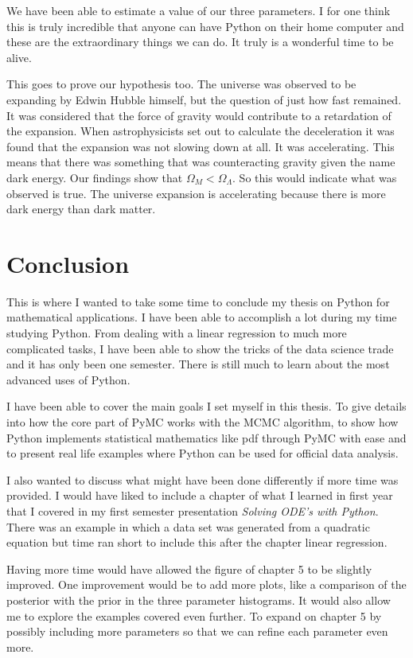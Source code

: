 \documentclass[12pt,twoside]{report}   %
\begin{document}
We have been able to estimate a value of our three parameters. I for one think this is truly incredible that anyone can have Python on their home computer and these are the extraordinary things we can do. It truly is a wonderful time to be alive.

This goes to prove our hypothesis too. The universe was observed to be expanding by Edwin Hubble himself, but the question of just how fast remained. It was considered that the force of gravity would contribute to a retardation of the expansion. When astrophysicists set out to calculate the deceleration it was found that the expansion was not slowing down at all. It was accelerating. This means that there was something that was counteracting gravity given the name dark energy. Our findings show that $\Omega_M < \Omega_\Lambda$. So this would indicate what was observed is true. The universe expansion is accelerating because there is more dark energy than dark matter.

\chapter{Conclusion}

This is where I wanted to take some time to conclude my thesis on Python for mathematical applications. I have been able to accomplish a lot during my time studying Python. From dealing with a linear regression to much more complicated tasks, I have been able to show the tricks of the data science trade and it has only been one semester. There is still much to learn about the most advanced uses of Python.

I have been able to cover the main goals I set myself in this thesis. To give details into how the core part of PyMC works with the MCMC algorithm, to show how Python implements statistical mathematics like pdf through PyMC with ease and to present real life examples where Python can be used for official data analysis.

I also wanted to discuss what might have been done differently if more time was provided. I would have liked to include a chapter of what I learned in first year that I covered in my first semester presentation \textit{Solving ODE's with Python}. There was an example in which a data set was generated from a quadratic equation but time ran short to include this after the chapter linear regression.

Having more time would have allowed the figure of chapter 5 to be slightly improved. One improvement would be to add more plots, like a comparison of the posterior with the prior in the three parameter histograms. It would also allow me to explore the examples covered even further. To expand on chapter 5 by possibly including more parameters so that we can refine each parameter even more. 
\end{document}

